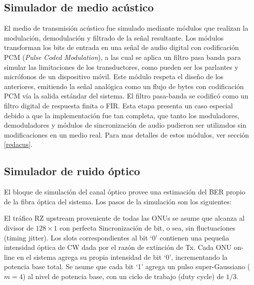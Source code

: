 \subsection{Simulador de medio acústico}

El medio de transmisión acústico fue simulado mediante módulos que realizan la modulación, demodulación y filtrado de la señal resultante.
Los módulos transforman los bits de entrada en una señal de audio digital con codificación PCM (\textit{Pulse Coded Modulation}), a las cual se aplica un filtro pasa banda para simular las limitaciones de los transductores, como pueden ser los parlantes y micrófonos de un dispositivo móvil. Este módulo respeta el diseño de los anteriores, emitiendo la señal analógica como un flujo de bytes con codificación PCM vía la salida estándar del sistema. El filtro pasa-banda se codificó como un filtro digital de respuesta finita o FIR.
Esta etapa presenta un caso especial debido a que la implementación fue tan completa, que tanto los moduladores, demoduladores y módulos de sincronización de audio pudieron ser utilizados sin modificaciones en un medio real. Para mas detalles de estos módulos, ver sección \ref{redacus}.

\subsection{Simulador de ruido óptico}

El bloque de simulación del canal óptico provee una estimación del BER propio de la fibra óptica del sistema. Los pasos de la simulación son los siguientes:

El tráfico RZ upstream proveniente de todas las ONUs se asume que alcanza al divisor de $128\times1$ con perfecta Sincronización de bit, o sea, sin fluctuaciones (timing jitter).
Los slots correspondientes al bit `0' contienen una pequeña intensidad óptica de CW dada por el razón de extinción de Tx.
Cada ONU on-line en el sistema agrega su propia intensidad de bit `0', incrementando la potencia base total.
Se asume que cada bit `1' agrega un pulso super-Gaussiano ($m=4$) al nivel de potencia base, con un ciclo de trabajo (duty cycle) de $1/3$.



